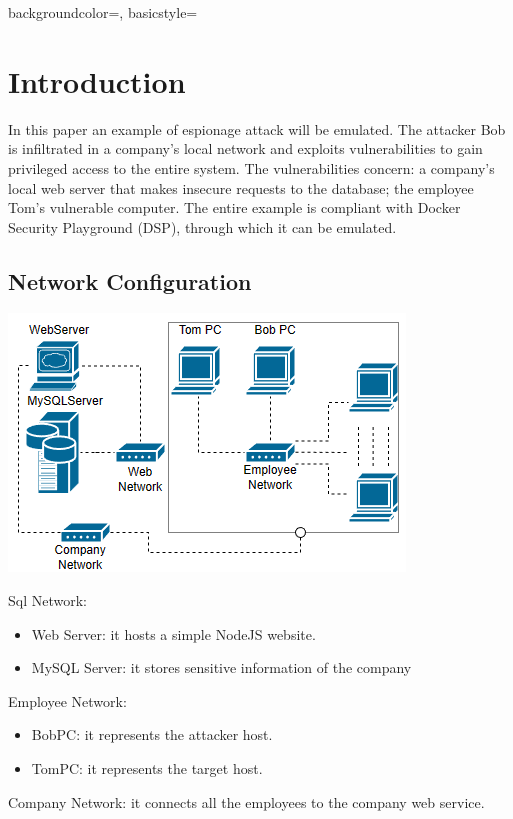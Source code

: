 \documentclass[a4paper, 12pt, oneside]{extbook}
\begin{document}

\frontmatter

{
\tableofcontents
}

{ 
    backgroundcolor=\color{black},
    basicstyle=\color{white}
}
\linespread{1}
\onehalfspacing

\mainmatter




\chapter{Introduction}
In this paper an example of espionage attack will be emulated. 
The attacker Bob is infiltrated in a company's local network and exploits vulnerabilities to gain privileged access to the entire system.
The vulnerabilities concern: a company's local web server that makes insecure requests to the database; the employee Tom's vulnerable computer.
The entire example is compliant with Docker Security Playground (DSP), through which it can be emulated.
\section{Network Configuration}
\begin{center}
\includegraphics[scale=1]{../Image/network.PNG}
\end{center}
Sql Network: 
\begin{itemize}
  \item Web Server: it hosts a simple NodeJS website.
  \item MySQL Server: it stores sensitive information of the company
\end{itemize} 
Employee Network: 
\begin{itemize}
  \item BobPC: it represents the attacker host.
  \item TomPC: it represents the target host.
\end{itemize} 
Company Network: it connects all the employees to the company web service.
\end{document}

